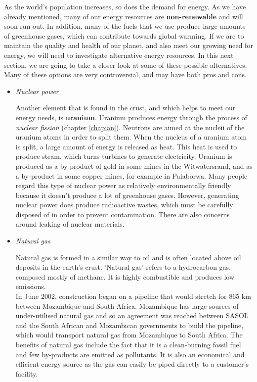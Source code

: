 As the world's population increases, so does the demand for energy. As we have already mentioned, many of our energy resources are \textbf{non-renewable} and will soon run out. In addition, many of the fuels that we use produce large amounts of greenhouse gases, which can contribute towards global warming. If we are to maintain the quality and health of our planet, and also meet our growing need for energy, we will need to investigate alternative energy resources. In this next section, we are going to take a closer look at some of these possible alternatives. Many of these options are very controversial, and may have both pros and cons.

\begin{itemize}

\item{\textit{Nuclear power}}

Another element that is found in the crust, and which helps to meet our energy needs, is \textbf{uranium}. Uranium produces energy through the process of \textit{nuclear fission} (chapter \ref{chap:an}). Neutrons are aimed at the nucleii of the uranium atoms in order to split them. When the nucleus of a uranium atom is split, a large amount of energy is released as heat. This heat is used to produce steam, which turns turbines to generate electricity. Uranium is produced as a by-product of gold in some mines in the Witwatersrand, and as a by-product in some copper mines, for example in Palaborwa. Many people regard this type of nuclear power as relatively environmentally friendly because it doesn't produce a lot of greenhouse gases. However, generating nuclear power does produce radioactive wastes, which must be carefully disposed of in order to prevent contamination. There are also concerns around leaking of nuclear materials.

\item{\textit{Natural gas}

Natural gas is formed in a similar way to oil and is often located above oil deposits in the earth's crust. 'Natural gas' refers to a hydrocarbon gas, composed mostly of methane. It is highly combustible and produces low emissions.\\

In June 2002, construction began on a pipeline that would stretch for 865 km between Mozambique and South Africa. Mozambique has large sources of under-utilised natural gas and so an agreement was reached between SASOL and the South African and Mozambican governments to build the pipeline, which would transport natural gas from Mozambique to South Africa. The benefits of natural gas include the fact that it is a clean-burning fossil fuel and few by-products are emitted as pollutants. It is also an economical and efficient energy source as the gas can easily be piped directly to a customer's facility.}


\end{itemize}
